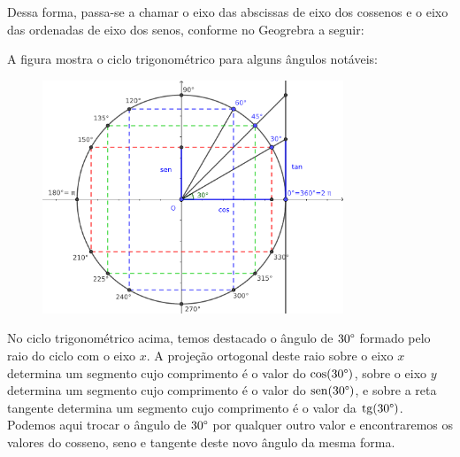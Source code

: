 Dessa forma, passa-se a chamar o eixo das abscissas de eixo dos cossenos e o eixo das ordenadas de eixo dos senos, conforme no Geogrebra a seguir:

  
 A figura mostra o ciclo trigonométrico para alguns ângulos notáveis:
 \begin{figure}[H]
   \centering
   \includegraphics[width=9cm]{./cap_trigon/figs/circulo_trigonometrico}
  \end{figure}

 No ciclo trigonométrico acima, temos destacado o ângulo de $30 \degree$ formado pelo raio do ciclo com o eixo $x$. A projeção ortogonal deste raio sobre o eixo $x$ determina um segmento cujo comprimento é o valor do $\cos(30 \degree)$, sobre o eixo $y$ determina um segmento cujo comprimento é o valor do $\operatorname{sen}(30 \degree)$, e sobre a reta tangente determina um segmento cujo comprimento é o valor da $\operatorname{tg}(30 \degree)$. Podemos aqui trocar o ângulo de $30 \degree$ por qualquer outro valor e encontraremos os valores do cosseno, seno e tangente deste novo ângulo da mesma forma.



 


